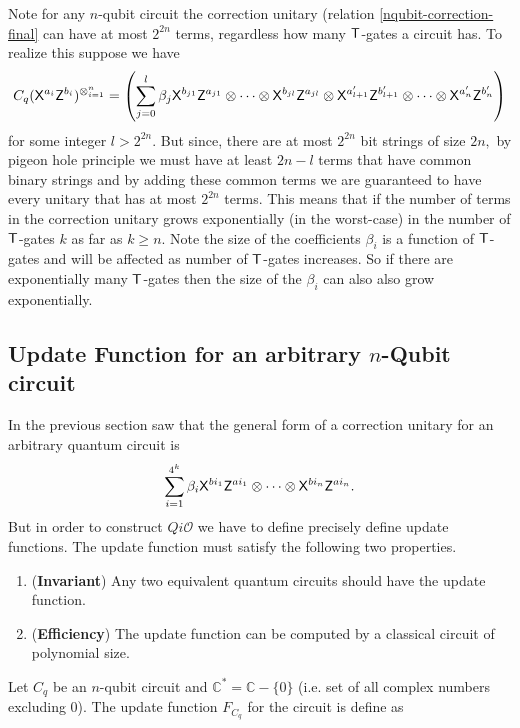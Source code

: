\begin{remark}
\label{remark:nqubit-correction2}
Note for any $n$-qubit circuit the correction unitary (relation \ref{nqubit-correction-final} can have at most $2^{2n}$ terms, regardless how many ${\sf T}$-gates a circuit has. To realize this suppose we have 
$$C_q ({\sf X}^{a_{i}}{\sf Z}^{b_{i}})^{\otimes_{i=1}^{n}}=\left(\sum_{j=0}^{l} \beta_j {\sf X}^{b_{j1}}{\sf Z}^{a_{j1}} \otimes \cdots \otimes{\sf X}^{b_{jl}}{\sf Z}^{a_{jl}} \otimes {\sf X}^{a_{l+1}^\prime}{\sf Z}^{b_{l+1}^\prime}  \otimes \cdots   \otimes{\sf X}^{a_{n}^\prime}{\sf Z}^{b_{n}^\prime}\right)$$
for some integer $l>2^{2n}.$
But since, there are at most $2^{2n}$ bit strings of size $2n,$ by pigeon hole principle we must have at least $2n-l$ terms that have common binary strings and by adding these common terms we are guaranteed to have every unitary that has at most $2^{2n}$ terms. This means that if the number of terms in the correction unitary grows exponentially (in the worst-case) in the number of ${\sf T}$-gates $k$ as far as $k\geq n.$ Note the size of the coefficients $\beta_i$ is a function of ${\sf T}$-gates and will be affected as number of ${\sf T}$-gates increases. So if there are exponentially many ${\sf T}$-gates then the size of the $\beta_i$ can also also grow exponentially. 
\end{remark}


\subsection{Update Function for an arbitrary $n$-Qubit circuit}
\label{nqubit:update-function}
In the previous section saw that the general form of a correction unitary for an arbitrary quantum circuit is $$\sum_{i=1}^{4^k} \beta_i {\sf X}^{b{i_1}} {\sf Z}^{a{i_1}}\otimes \cdots \otimes {\sf X}^{b{i_n}} {\sf Z}^{a{i_n}}.$$ But in order to construct $Qi\mathcal{O}$ we have to define precisely define update functions. The update function must satisfy the following two properties.

\begin{enumerate}
\item ({\bf Invariant}) Any two equivalent quantum circuits should have the update function.
\item ({\bf Efficiency}) The update function can be computed by a classical circuit of polynomial size.
\end{enumerate}

Let $C_q$ be an $n$-qubit circuit and $\mathbb{C}^*= \mathbb{C}-\{0\}$ (i.e. set of all complex numbers excluding 0). The update function $F_{C_q}$ for the circuit is define as 

